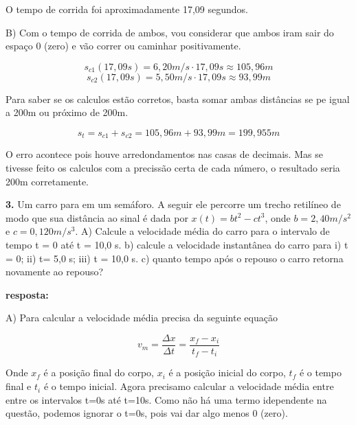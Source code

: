 \documentclass[a4paper, 12pt]{article}
\begin{document}
\begin{flushleft}
		O tempo de corrida foi aproximadamente 17,09 segundos.
		
		B) Com o tempo de corrida de ambos, vou considerar que ambos iram sair do espaço 0 (zero) e vão correr ou caminhar positivamente.
		
		\begin{equation*}
			s_{c1}(17,09s) = 6,20m/s \cdot 17,09s \approx 105,96m
		\end{equation*}
		\begin{equation*}
			s_{c2}(17,09s) = 5,50m/s \cdot 17,09s \approx 93,99m
		\end{equation*}
		
		Para saber se os calculos estão corretos, basta somar ambas distâncias se pe igual a 200m ou próximo de 200m.
		
		\begin{equation*}
			s_{t} = s_{c1} + s_{c2} = 105,96m + 93,99m = 199,955m
		\end{equation*}
		
		O erro acontece pois houve arredondamentos nas casas de decimais. Mas se tivesse feito os calculos com a precissão certa de cada número, o resultado seria 200m corretamente.
		
		
		\vspace{2em}
		
		
		\textbf{3.} Um carro para em um semáforo. A seguir ele percorre um trecho retilíneo de modo que sua distância ao sinal é dada por $x(t) = bt^2 - ct^3$, onde $b = 2,40m/s^2$ e $c = 0,120m/s^3$. A) Calcule a velocidade média do carro para o intervalo de tempo t = 0 até t = 10,0 s. b) calcule a velocidade instantânea do carro para i) t = 0; ii) t= 5,0 s; iii) t = 10,0 s. c) quanto tempo após o repouso o carro retorna novamente ao repouso?
		
		\textbf{resposta:}
		
		A) Para calcular a velocidade média precisa da seguinte equação
		
		\begin{equation*}\label{exercicio3eq1}
			v_m = \frac{\Delta{x}}{\Delta{t}} = \frac{x_f - x_i}{t_f - t_i}
		\end{equation*}
		
		Onde $x_f$ é a posição final do corpo, $x_i$ é a posição inicial do corpo, $t_f$ é o tempo final e $t_i$ é o tempo inicial. Agora precisamo calcular a velocidade média entre entre os intervalos t=0s até t=10s. Como não há uma termo idependente na questão, podemos ignorar o t=0s, pois vai dar algo menos 0 (zero).
		

\end{flushleft}
\end{document}
